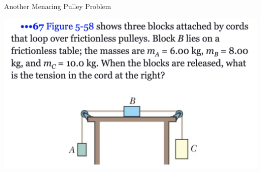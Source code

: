 \begin{frame}{Another Menacing Pulley Problem}
\scriptsize


\includegraphics[scale=0.25]{ballots}
\end{frame}
%

%

